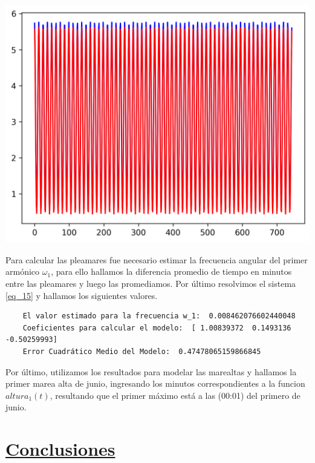 \documentclass[10pt,a4paper]{article}
\numberwithin{equation}{section}
\numberwithin{figure}{section}
\numberwithin{table}{section}
\begin{document}
\begin{minipage}{\textwidth}
    \centering
        \includegraphics[scale=1]{ Images/aprox_enero_aprox_marzo.png}\\
     \label{fig:fig2}
\end{minipage}
   
Para calcular las pleamares fue necesario estimar la frecuencia angular del primer armónico $\omega_1$, para ello hallamos la diferencia promedio de tiempo en minutos entre las pleamares y luego las promediamos. 
Por último resolvimos el sistema \ref{eq_15} y hallamos los siguientes valores.

\begin{verbatim}
    El valor estimado para la frecuencia w_1:  0.008462076602440048
    Coeficientes para calcular el modelo:  [ 1.00839372  0.1493136  -0.50259993]
    Error Cuadrático Medio del Modelo:  0.47478065159866845    
\end{verbatim}

Por último, utilizamos los resultados para modelar las marealtas y hallamos la primer marea alta de junio, ingresando los minutos correspondientes a la funcion $altura_1(t)$, resultando que el primer máximo está a las (00:01) del primero de junio.


\section{\underline{Conclusiones}}
\end{document}
